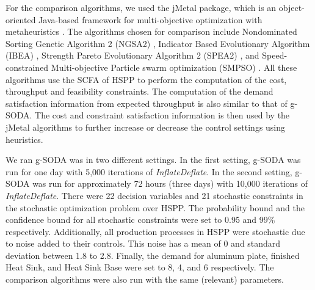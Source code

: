 \documentclass[a4paper, 12pt]{article} %
\begin{document}
For the comparison algorithms, we used the jMetal package, which is an object-oriented Java-based framework for multi-objective optimization with metaheuristics \cite{jMetal}. The algorithms chosen for comparison include Nondominated Sorting Genetic Algorithm 2 (NGSA2) \cite{ngsa2}, Indicator Based Evolutionary Algorithm (IBEA) \cite{ibea}, Strength Pareto Evolutionary Algorithm 2 (SPEA2) \cite{spea2}, and Speed-constrained Multi-objective Particle swarm optimization (SMPSO) \cite{NDG09}.
All these algorithms use the SCFA of HSPP to perform the computation of the cost, throughput and feasibility constraints. The computation of the demand satisfaction information from expected throughput is also similar to that of g-SODA. The cost and constraint satisfaction information is then used by the jMetal algorithms to further increase or decrease the control settings using heuristics.

We ran g-SODA was in two different settings. 
In the first setting, g-SODA was run for one day with 5,000 iterations of \textit{InflateDeflate}. In the second setting, g-SODA was run for approximately 72 hours (three days) with 10,000 iterations of \textit{InflateDeflate}. There were 22 decision variables and 21 stochastic constraints in the stochastic optimization problem over HSPP. The probability bound and the confidence bound for all stochastic constraints were set to 0.95 and 99\% respectively. Additionally, all production processes in HSPP were stochastic due to noise added to their controls. This noise has a mean of 0 and standard deviation between 1.8 to 2.8. 
Finally, the demand for aluminum plate, finished Heat Sink, and Heat Sink Base were set to 8, 4, and 6 respectively.
The comparison algorithms were also run with the same (relevant) parameters.
\end{document}
